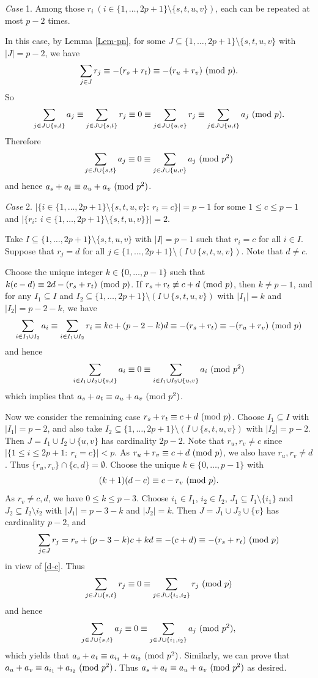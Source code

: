 \documentclass[11pt,reqno]{amsart}
\def\pmod #1{\ ({\rm{mod}}\ #1)}
\def\ls{\leqslant}
\def\se {\subseteq}
\def\sm{\setminus}
\def\eq{\equiv}
\theoremstyle{plain}
\theoremstyle{definition}
\theoremstyle{remark}
\begin{document}
{\it Case} 1. Among those $r_i\ (i\in\{1,\ldots,2p+1\}\sm\{s,t,u,v\})$, each can be repeated at most $p-2$ times.

In this case, by Lemma \ref{Lem-pn}, for some $J\se\{1,\ldots,2p+1\}\sm\{s,t,u,v\}$ with $|J|=p-2$,
we have
$$\sum_{j\in J} r_j\eq -(r_s+r_t)\eq-(r_u+r_v)\pmod p.$$
So
$$\sum_{j\in J\cup\{s,t\}}a_j\eq\sum_{j\in J\cup\{s,t\}}r_j\eq0\eq\sum_{j\in J\cup\{u,v\}}r_j
\eq \sum_{j\in J\cup\{u,t\}}a_j\pmod p.$$
Therefore
$$\sum_{j\in J\cup\{s,t\}}a_j\eq0\eq \sum_{j\in J\cup\{u,v\}}a_j\pmod{p^2}$$
and hence $a_s+a_t\eq a_u+a_v\pmod{p^2}$.

{\it Case} 2. $|\{i\in\{1,\ldots,2p+1\}\sm\{s,t,u,v\}:\ r_i=c\}|=p-1$ for some $1\ls c\ls p-1$
and $|\{r_i:\ i\in\{1,\ldots,2p+1\}\sm\{s,t,u,v\}\}|=2$.

Take $I\se\{1,\ldots,2p+1\}\sm\{s,t,u,v\}$ with $|I|=p-1$ such that $r_i=c$ for all $i\in I$.
Suppose that
$r_j=d$ for all $j\in\{1,\ldots,2p+1\}\sm(I\cup\{s,t,u,v\})$.
Note that $d\not=c$.

 Choose the unique integer $k\in\{0,\ldots,p-1\}$ such that $k(c-d)\eq 2d-(r_s+r_t)\pmod p$.
If $r_s+r_t\not\eq c+d\pmod p$, then $k\not=p-1$, and for any $I_1\se I$ and $I_2\se\{1,\ldots,2p+1\}\sm(I\cup\{s,t,u,v\})$ with $|I_1|=k$ and $|I_2|=p-2-k$, we have
$$\sum_{i\in I_1\cup I_2}a_i\eq \sum_{i\in I_1\cup I_2}r_i\eq kc+(p-2-k)d\eq-(r_s+r_t)\eq-(r_u+r_v)\pmod p$$
and hence
$$\sum_{i\in I_1\cup I_2\cup\{s,t\}}a_i\eq0\eq \sum_{i\in I_1\cup I_2\cup\{u,v\}}a_i\pmod{p^2}$$
which implies that $a_s+a_t\eq a_u+a_v\pmod{p^2}$.

Now we consider the remaining case $r_s+r_t\eq c+d\pmod p$.
Choose $I_1\se I$ with $|I_1|=p-2$, and also take $I_2\se\{1,\ldots,2p+1\}\sm (I\cup\{s,t,u,v\})$
with $|I_2|=p-2$. Then $J=I_1\cup I_2\cup\{u,v\}$ has cardinality $2p-2$. Note that $r_u,r_v\not=c$
since $|\{1\ls i\ls 2p+1:\ r_i=c\}|<p$. As $r_u+r_v\eq c+d\pmod p$, we also have $r_u,r_v\not=d$. Thus $\{r_u,r_v\}\cap\{c,d\}=\emptyset$. Choose the unique $k\in\{0,\ldots,p-1\}$
 with
 \begin{equation}\label{d-c}
 (k+1)(d-c)\eq c-r_v\pmod p.
 \end{equation}
  As $r_v\not=c,d$, we have $0\ls k\ls p-3$.
 Choose $i_1\in I_1$, $i_2\in I_2$, $J_1\se I_1\sm\{i_1\}$ and $J_2\se I_2\sm{i_2}$ with $|J_1|=p-3-k$ and $|J_2|=k$. Then $J=J_1\cup J_2\cup\{v\}$
 has cardinality $p-2$, and
 $$\sum_{j\in J}r_j=r_v+(p-3-k)c+kd\eq-(c+d)\eq-(r_s+r_t)\pmod p$$
 in view of \eqref{d-c}. Thus
 $$\sum_{j\in J\cup\{s,t\}}r_j\eq0\eq\sum_{j\in J\cup\{i_1,i_2\}}r_j\pmod p$$
 and hence
 $$\sum_{j\in J\cup\{s,t\}}a_j\eq0\eq\sum_{j\in J\cup\{i_1,i_2\}}a_j\pmod {p^2},$$
 which yields that $a_s+a_t\eq a_{i_1}+a_{i_2}\pmod{p^2}$.
 Similarly, we can prove that $a_u+a_v\eq a_{i_1}+a_{i_2}\pmod{p^2}$.
 Thus $a_s+a_t\eq a_u+a_v\pmod{p^2}$ as desired.
\end{document}
